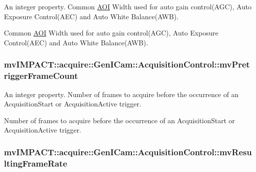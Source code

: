 An integer property. Common \hyperlink{struct_a_o_i}{A\+O\+I} Width used for auto gain control(\+A\+G\+C), Auto Exposure Control(\+A\+E\+C) and Auto White Balance(\+A\+W\+B). 

Common \hyperlink{struct_a_o_i}{A\+O\+I} Width used for auto gain control(\+A\+G\+C), Auto Exposure Control(\+A\+E\+C) and Auto White Balance(\+A\+W\+B). \hypertarget{classmv_i_m_p_a_c_t_1_1acquire_1_1_gen_i_cam_1_1_acquisition_control_a9e6def5d7d1abf571164b4b154a36a49}{
\subsubsection[{mv\+Pretrigger\+Frame\+Count}]{ mv\+I\+M\+P\+A\+C\+T\+::acquire\+::\+Gen\+I\+Cam\+::\+Acquisition\+Control\+::mv\+Pretrigger\+Frame\+Count}}\label{classmv_i_m_p_a_c_t_1_1acquire_1_1_gen_i_cam_1_1_acquisition_control_a9e6def5d7d1abf571164b4b154a36a49}


An integer property. Number of frames to acquire before the occurrence of an Acquisition\+Start or Acquisition\+Active trigger. 

Number of frames to acquire before the occurrence of an Acquisition\+Start or Acquisition\+Active trigger. \hypertarget{classmv_i_m_p_a_c_t_1_1acquire_1_1_gen_i_cam_1_1_acquisition_control_a0da1e66aa1cd3ee5ae9ec1751950040a}{
\subsubsection[{mv\+Resulting\+Frame\+Rate}]{ mv\+I\+M\+P\+A\+C\+T\+::acquire\+::\+Gen\+I\+Cam\+::\+Acquisition\+Control\+::mv\+Resulting\+Frame\+Rate}}\label{classmv_i_m_p_a_c_t_1_1acquire_1_1_gen_i_cam_1_1_acquisition_control_a0da1e66aa1cd3ee5ae9ec1751950040a}



